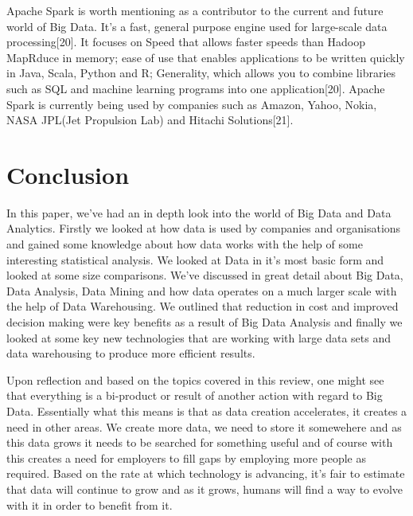 \documentclass[10pt,journal,compsoc]{IEEEtran}
\begin{document}
Apache Spark is worth mentioning as a contributor to the current and future world of Big Data. It's a fast, general purpose engine used for large-scale data processing[20]. It focuses on Speed that allows faster speeds than Hadoop MapRduce in memory; ease of use that enables applications to be written quickly in Java, Scala, Python and R; Generality, which allows you to combine libraries such as SQL and machine learning programs into one application[20]. Apache Spark is currently being used by companies such as Amazon, Yahoo, Nokia, NASA JPL(Jet Propulsion Lab) and Hitachi Solutions[21].


\section{Conclusion}
In this paper, we've had an in depth look into the world of Big Data and Data Analytics. Firstly we looked at how data is used by companies and organisations and gained some knowledge about how data works with the help of some interesting statistical analysis. We looked at Data in it's most basic form and looked at some size comparisons. We've discussed in great detail about Big Data, Data Analysis, Data Mining and how data operates on a much larger scale with the help of Data Warehousing. We outlined that reduction in cost and improved decision making were key benefits as a result of Big Data Analysis and finally we looked at some key new technologies that are working with large data sets and data warehousing to produce more efficient results. 

Upon reflection and based on the topics covered in this review, one might see that everything is a bi-product or result of another action with regard to Big Data. Essentially what this means is that as data creation accelerates, it creates a need in other areas. We create more data, we need to store it somewehere and as this data grows it needs to be searched for something useful and of course with this creates a need for employers to fill gaps by employing more people as required. Based on the rate at which technology is advancing, it's fair to estimate that data will continue to grow and as it grows, humans will find a way to evolve with it in order to benefit from it. 
\end{document}

